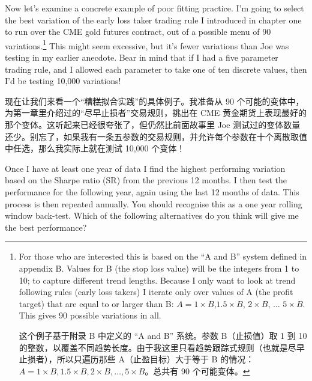 
\begin{englishblock} Now let's examine a concrete example of poor fitting practice. I'm going to select the best variation of the early loss taker trading rule I introduced in chapter one to run over the CME gold futures contract, out of a possible menu of 90 variations.\footnote{For those who are interested this is based on the ``A and B'' system defined in appendix B. Values for B (the stop loss value) will be the integers from 1 to 10; to capture different trend lengths. Because I only want to look at trend following rules (early loss takers) I iterate only over values of A (the profit target) that are equal to or larger than B: $A = 1 \times B$,$1.5 \times B$, $2 \times B$, ... $5 \times B$. This gives 90 possible variations in all. \par 这个例子基于附录 B 中定义的 “A and B” 系统。参数 B（止损值）取 1 到 10 的整数，以覆盖不同趋势长度。由于我这里只看趋势跟踪式规则（也就是尽早止损者），所以只遍历那些 A（止盈目标）大于等于 B 的情况：\(A = 1 \times B, 1.5 \times B, 2 \times B, \dots, 5 \times B\)。总共有 90 个可能变体。} This might seem excessive, but it's fewer variations than Joe was testing in my earlier anecdote. Bear in mind that if I had a five parameter trading rule, and I allowed each parameter to take one of ten discrete values, then I'd be testing 10,000 variations! \end{englishblock}

\begin{chineseblock}现在让我们来看一个“糟糕拟合实践”的具体例子。我准备从 90 个可能的变体中，为第一章里介绍过的“尽早止损者”交易规则，挑出在 CME 黄金期货上表现最好的那个变体。这听起来已经很夸张了，但仍然比前面故事里 Joe 测试过的变体数量还少。别忘了，如果我有一条五参数的交易规则，并允许每个参数在十个离散取值中任选，那么我实际上就在测试 10,000 个变体！\end{chineseblock}

\bipairgap

\begin{englishblock} Once I have at least one year of data I find the highest performing variation based on the Sharpe ratio (SR) from the previous 12 months. I then test the performance for the following year, again using the last 12 months of data. This process is then repeated annually. You should recognise this as a one year rolling window back-test. Which of the following alternatives do you think will give me the best performance? \end{englishblock}

